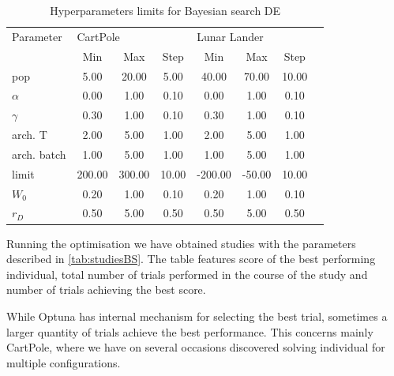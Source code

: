 \begin{table}[ht]
	\centering
	\scriptsize
	\setlength{\tabcolsep}{4pt}
	\renewcommand{\arraystretch}{1.15}
	\begin{tabular}{l||ccc|cccc}
		\toprule
		Parameter & \multicolumn{3}{l}{CartPole} & \multicolumn{3}{l}{Lunar Lander} \\
		&      Min &    Max &  Step &         Min &    Max &  Step \\
		\midrule
		pop &     5.00 &  20.00 &  5.00 &       40.00 &  70.00 & 10.00 \\
		$\alpha$ &     0.00 &   1.00 &  0.10 &        0.00 &   1.00 &  0.10 \\
		$\gamma$ &     0.30 &   1.00 &  0.10 &        0.30 &   1.00 &  0.10 \\
		arch. T &     2.00 &   5.00 &  1.00 &        2.00 &   5.00 &  1.00 \\
		arch. batch &     1.00 &   5.00 &  1.00 &        1.00 &   5.00 &  1.00 \\
		limit &   200.00 & 300.00 & 10.00 &     -200.00 & -50.00 & 10.00 \\
		$W_0$ &     0.20 &   1.00 &  0.10 &        0.20 &   1.00 &  0.10 \\
		$r_D$ &     0.50 &   5.00 &  0.50 &        0.50 &   5.00 &  0.50 \\
		\bottomrule
	\end{tabular}
	\caption{Hyperparameters limits for Bayesian search DE}
	\label{tab:optunaStart2}
\end{table}

Running the optimisation we have obtained studies with the parameters described in \cref{tab:studiesBS}. The table features score of the best performing individual, total number of trials performed in the course of the study and number of trials achieving the best score.

\begin{table}[ht]
	\centering
	\scriptsize
	\setlength{\tabcolsep}{4pt}
	\renewcommand{\arraystretch}{1.15}
	\resizebox{\textwidth}{!}{%
		
	}
	\caption{Performed Optuna studies for each container - Best score = maximum achieved fitness, Trials = total trial count, Best trials = no. trials achieving the maximum fitness, DE and ES are names of the EAs}
	\label{tab:studiesBS}
\end{table}

While Optuna has internal mechanism for selecting the best trial, sometimes a larger quantity of trials achieve the best performance. This concerns mainly CartPole, where we have on several occasions discovered solving individual for multiple configurations. 

